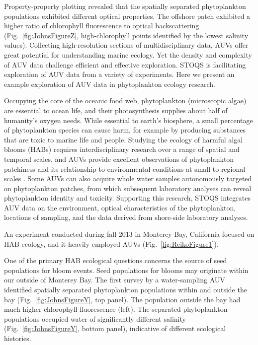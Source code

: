 Property-property plotting revealed that the spatially separated phytoplankton populations exhibited different optical properties.  The offshore patch exhibited a higher ratio of chlorophyll fluorescence to optical backscattering (Fig.~\ref{fig:JohnsFigureZ}, high-chlorophyll points identified by the lowest salinity values).
Collecting high-resolution sections of multidisciplinary data, AUVs offer great potential for understanding marine ecology.  Yet the density and complexity of AUV data challenge efficient and effective exploration.  STOQS is facilitating exploration of AUV data from a variety of experiments.  Here we present an example exploration of AUV data in phytoplankton ecology research.

Occupying the core of the oceanic food web, phytoplankton (microscopic algae) are essential to ocean life, and their photosynthesis supplies about half of humanity’s oxygen needs.  While essential to earth’s biosphere, a small percentage of phytoplankton species can cause harm, for example by producing substances that are toxic to marine life and people.  Studying the ecology of harmful algal blooms (HABs) requires interdisciplinary research over a range of spatial and temporal scales, and AUVs provide excellent observations of phytoplankton patchiness and its relationship to environmental conditions at small to regional scales \cite{Scholin2000}.  Some AUVs can also acquire whole water samples autonomously targeted on phytoplankton patches, from which subsequent laboratory analyses can reveal phytoplankton identity and toxicity.  Supporting this research, STOQS integrates AUV data on the environment, optical characteristics of the phytoplankton, locations of sampling, and the data derived from shore-side laboratory analyses.

An experiment conducted during fall 2013 in Monterey Bay, California focused on HAB ecology, and it heavily employed AUVs (Fig.~\ref{fig:ReikoFigure1}).  

One of the primary HAB ecological questions concerns the source of seed populations for bloom events.  Seed populations for blooms may originate within our outside of Monterey Bay.  The first survey by a water-sampling AUV identified spatially separated phytoplankton populations within and outside the bay (Fig.~\ref{fig:JohnsFigureY}, top panel).  The population outside the bay had much higher chlorophyll fluorescence (left).  The separated phytoplankton populations occupied water of significantly different salinity (Fig.~\ref{fig:JohnsFigureY}, bottom panel), indicative of different ecological histories.


